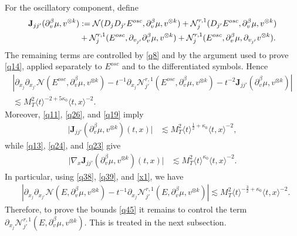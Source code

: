 \documentclass[reqno,11pt]{amsart}
\numberwithin{equation}{section}
\begin{document}
For the oscillatory component, define
\begin{align*}
\mathbf J_{jj'}(\partial_v^\beta\mu,v^{\otimes k})
&:=\mathcal N(D_jD_{j'}E^{osc},\partial_v^\beta\mu,v^{\otimes k})
+\mathcal N_j^{r,1}(D_{j'}E^{osc},\partial_v^\beta\mu,v^{\otimes k})
\notag\\
&+\mathcal N_j^{r,1}(E^{osc},\partial_{v_{j'}}\partial_v^\beta\mu,v^{\otimes k})
+\mathcal N_j^{r,1}(E^{osc},\partial_v^\beta\mu,\partial_{v_{j'}}v^{\otimes k}).
\end{align*}
The remaining terms are controlled by \eqref{q8} and by the argument used
to prove \eqref{q14}, applied separately to $E^{osc}$ and to the
differentiated symbols. Hence
\begin{equation}\label{q39}
\begin{split}
\left|\partial_{x_j}\partial_{x_{j'}}
\mathcal N(E^{osc},\partial_v^\beta\mu,v^{\otimes k})-t^{-1}\partial_{x_j}
\mathcal N_{j'}^{r,1}(E^{osc},\partial_v^\beta\mu,v^{\otimes k})-t^{-2}\mathbf J_{jj'}(\partial_v^\beta\mu,v^{\otimes k})\right|\\
\lesssim M_T^2\langle t\rangle^{-2+5\kappa_0}\langle t,x\rangle^{-2}.
\end{split}
\end{equation}
Moreover, \eqref{q11}, \eqref{q26}, and \eqref{q19} imply
\begin{align}
\big|\mathbf J_{jj'}(\partial_v^\beta\mu,v^{\otimes k})(t,x)\big|
&\lesssim M_T^2\langle t\rangle^{\frac12+\kappa_0}\langle t,x\rangle^{-2},
\label{x1}
\end{align}
while \eqref{q13}, \eqref{q24}, and \eqref{q23} give
\begin{align}
\big|\nabla_x\mathbf J_{jj'}(\partial_v^\beta\mu,v^{\otimes k})(t,x)\big|&\lesssim M_T^2\langle t\rangle^{\kappa_0}\langle t,x\rangle^{-2}.
\label{x2}
\end{align}
In particular, using \eqref{q38}, \eqref{q39}, and \eqref{x1}, we have
\begin{align}
&\left|\partial_{x_j}\partial_{x_{j'}}
\mathcal N(E,\partial_v^\beta\mu,v^{\otimes k})
-t^{-1}\partial_{x_j}
\mathcal N_{j'}^{r,1}(E,\partial_v^\beta\mu,v^{\otimes k})\right|\lesssim
M_T^2\langle t\rangle^{-\frac32+\kappa_0}\langle t,x\rangle^{-2}.
\label{q39.5}
\end{align}
Therefore, to prove the bounds \eqref{q45} it remains to control the term $\partial_{x_j}
\mathcal N_{j'}^{r,1}(E,\partial_v^\beta\mu,v^{\otimes k})$. This is treated in the next subsection.
\end{document}
